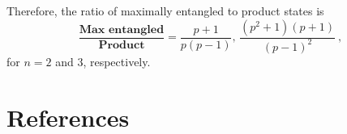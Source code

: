 \documentclass[12pt]{iopart}
\begin{document}
Therefore, the ratio of maximally entangled to product states is
\[
\frac{\textbf{Max entangled}}{\textbf{Product}}=\frac{p+1}{p\left(p-1\right)} ,\, \frac{\left(p^2+1\right)\left(p+1\right)}{\left(p-1\right)^2} \ ,
\]
for $n=2$ and $3$, respectively.



\section*{References}

{}



\end{document}

